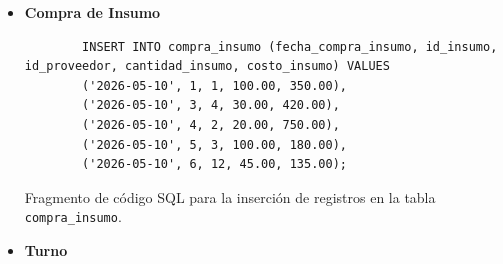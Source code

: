 \begin{itemize}
      \item \textbf{Compra de Insumo}
    \begin{listing}[H]
        \centering
        \begin{verbatim}
        INSERT INTO compra_insumo (fecha_compra_insumo, id_insumo, id_proveedor, cantidad_insumo, costo_insumo) VALUES
        ('2026-05-10', 1, 1, 100.00, 350.00),
        ('2026-05-10', 3, 4, 30.00, 420.00),
        ('2026-05-10', 4, 2, 20.00, 750.00),
        ('2026-05-10', 5, 3, 100.00, 180.00),
        ('2026-05-10', 6, 12, 45.00, 135.00);
        \end{verbatim}
        \caption{Fragmento de código SQL para la inserción de registros en la tabla \texttt{compra\_insumo}.}
        \label{lst:insert_compra_insumo}
    \end{listing}
    \item \textbf{Turno}
    \begin{listing}[H]
        \centering
        \begin{minted}[
            frame=lines,
            linenos,
            breaklines,
            fontsize=\footnotesize,

\end{verbatim}
\end{listing}
\end{itemize}
